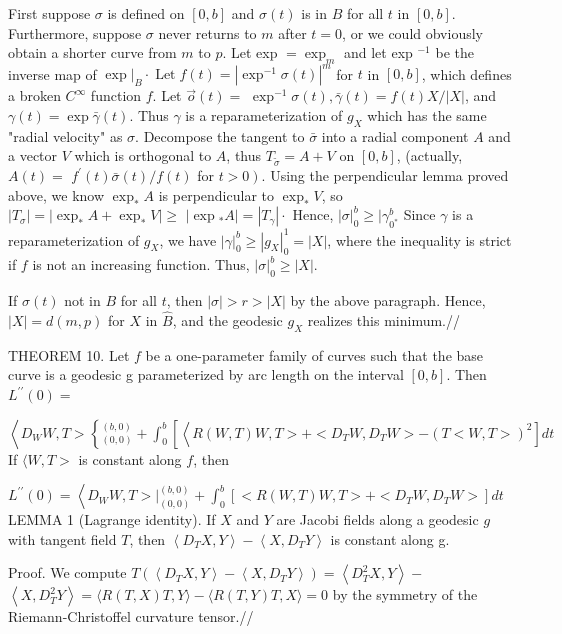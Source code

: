 \documentclass[10pt]{article}
\begin{document}
First suppose $\sigma$ is defined on $[0, b]$ and $\sigma(t)$ is in $B$ for all $t$ in $[0, b]$. Furthermore, suppose $\sigma$ never returns to $m$ after $t=0$, or we could obviously obtain a shorter curve from $m$ to $p$. Let exp $=\exp _{m}$ and let exp ${ }^{-1}$ be the inverse map of $\left.\exp \right|_{B} \cdot \operatorname{Let} f(t)=\left|\exp ^{-1} \sigma(t)\right|^{m}$ for $t$ in $[0, b]$, which defines a broken $C^{\infty}$ function $f$. Let $\vec{o}(t)=$ $\exp ^{-1} \sigma(t), \bar{\gamma}(t)=f(t) X /|X|$, and $\gamma(t)=\exp \bar{\gamma}(t)$. Thus $\gamma$ is a reparameterization of $g_{X}$ which has the same "radial velocity" as $\sigma$. Decompose the tangent to $\bar{\sigma}$ into a radial component $A$ and a vector $V$ which is orthogonal to $A$, thus $T_{\tilde{\sigma}}=A+V$ on $[0, b]$, (actually, $A(t)=$ $f^{\prime}(t) \bar{\sigma}(t) / f(t)$ for $\left.t>0\right)$. Using the perpendicular lemma proved above, we know $\exp _{*} A$ is perpendicular to $\exp _{*} V$, so $\left|T_{\sigma}\right|=\left|\exp _{*} A+\exp _{*} V\right| \geq$ $\left|\exp { }_{*} A\right|=\left|T_{\gamma}\right| \cdot$ Hence, $|\sigma|_{0}^{b} \geq \mid \gamma_{0^{*}}^{b}$ Since $\gamma$ is a reparameterization of $g_{X}$, we have $|\gamma|_{0}^{b} \geq\left|g_{X}\right|_{0}^{1}=|X|$, where the inequality is strict if $f$ is not an increasing function. Thus, $|\sigma|_{0}^{b} \geq|X|$.

If $\sigma(t)$ not in $B$ for all $t$, then $|\sigma|>r>|X|$ by the above paragraph. Hence, $|X|=d(m, p)$ for $X$ in $\hat{B}$, and the geodesic $g_{X}$ realizes this minimum.//

THEOREM 10. Let $f$ be a one-parameter family of curves such that the base curve is a geodesic g parameterized by arc length on the interval $[0, b]$. Then $L^{\prime \prime}(0)=$

$\left\langle D_{W} W, T>\left\{_{(0,0)}^{(b, 0)}+\int_{0}^{b}\left[\left\langle R(W, T) W, T>+<D_{T} W, D_{T} W>-(T<W, T>)^{2}\right] d t\right.\right.\right.$ If $\langle W, T>$ is constant along $f$, then

$L^{\prime \prime}(0)=\left\langle D_{W} W, T>\left.\right|_{(0,0)} ^{(b, 0)}+\int_{0}^{b}\left[<R(W, T) W, T>+<D_{T} W, D_{T} W>\right] d t\right.$ LEMMA 1 (Lagrange identity). If $X$ and $Y$ are Jacobi fields along a geodesic $g$ with tangent field $T$, then $\left\langle D_{T} X, Y\right\rangle-\left\langle X, D_{T} Y\right\rangle$ is constant along g.

Proof. We compute $T\left(\left\langle D_{T} X, Y\right\rangle-\left\langle X, D_{T} Y\right\rangle\right)=\left\langle D_{T}^{2} X, Y\right\rangle-$ $\left\langle X, D_{T}^{2} Y\right\rangle=\langle R(T, X) T, Y\rangle-\langle R(T, Y) T, X\rangle=0$ by the symmetry of the Riemann-Christoffel curvature tensor.//
\end{document}

